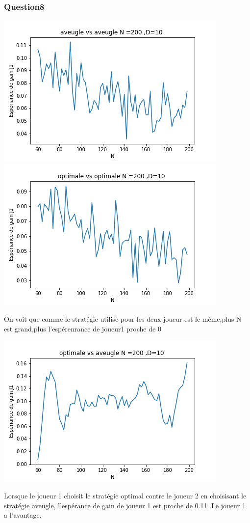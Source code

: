 \documentclass[12pt,a4paper]{article}
\begin{document}
\subsubsection{Question8}
\graphicspath{{.}}
\begin{center}
\includegraphics{a_vs_a.png}
\includegraphics{o_vs_o.png}
\end{center}
On voit que comme le stratégie utilisé pour les deux joueur est le même,plus N est grand,plus l'espérenrance de joueur1 proche de 0 
\begin{center}
\includegraphics{o_vs_a.png}
\end{center}
Lorsque le joueur 1 choisit le stratégie optimal contre le joueur 2 en choisisant le stratégie aveugle, l'espérance de gain de joueur 1 est proche de 0.11. Le joueur 1 a l'avantage.  
\end{document}
